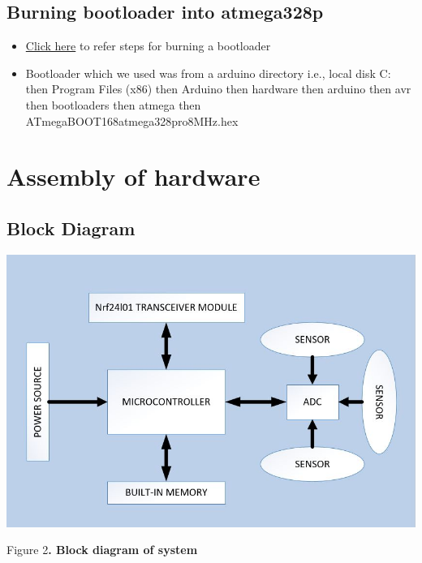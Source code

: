 \documentclass[a4paper,12pt,oneside]{book}
\begin{document}
\subsection*{Burning bootloader into atmega328p}

\begin{itemize}
\item \href{https://learn.sparkfun.com/tutorials/installing-an-arduino-bootloader}{Click here} to refer steps for burning a bootloader 
\item Bootloader which we used was from a arduino directory i.e., local disk C: then Program Files (x86) then Arduino then hardware then arduino then avr then bootloaders then atmega then ATmegaBOOT168atmega328pro8MHz.hex 
\end{itemize}
\section{Assembly of hardware}

\subsection*{Block Diagram}
\includegraphics[width=1\textwidth]{block_diagram_node.JPG}
\begin{center}
         \small{Figure 2\textbf{. Block diagram of system}}
\end{center}
\clearpage
\end{document}
